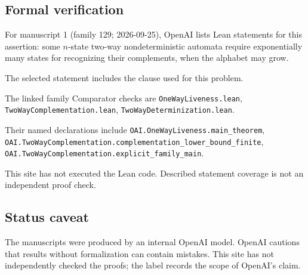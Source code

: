 \documentclass[11pt]{article}
\begin{document}
\subsection{Formal verification}
For manuscript 1 (family 129; 2026-09-25), OpenAI lists Lean statements for this assertion: some $n$-state two-way nondeterministic automata require exponentially many states for recognizing their complements, when the alphabet may grow.

The selected statement includes the clause used for this problem.

The linked family Comparator checks are \texttt{OneWayLiveness.lean}, \texttt{TwoWayComplementation.lean}, \texttt{TwoWayDeterminization.lean}.

Their named declarations include \texttt{OAI.OneWayLiveness.main\_theorem}, \texttt{OAI.TwoWayComplementation.complementation\_lower\_bound\_finite}, \texttt{OAI.TwoWayComplementation.explicit\_family\_main}.

This site has not executed the Lean code. Described statement coverage is not an independent proof check.

\subsection{Status caveat}
The manuscripts were produced by an internal OpenAI model. OpenAI cautions that results without formalization can contain mistakes. This site has not independently checked the proofs; the label records the scope of OpenAI's claim.
\end{document}
